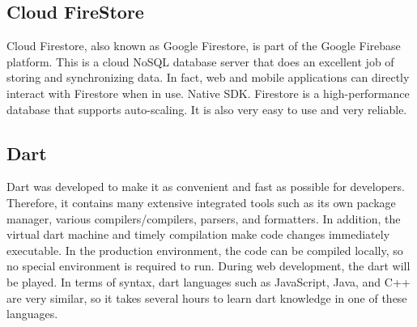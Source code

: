 \subsection{Cloud FireStore}
Cloud Firestore, also known as Google Firestore, is part of the Google Firebase platform. This is a cloud NoSQL database server that does an excellent job of storing and synchronizing data. In fact, web and mobile applications can directly interact with Firestore when in use. Native SDK. Firestore is a high-performance database that supports auto-scaling. It is also very easy to use and very reliable.

\subsection{Dart}
Dart was developed to make it as convenient and fast as possible for developers. Therefore, it contains many extensive integrated tools such as its own package manager, various compilers/compilers, parsers, and formatters. In addition, the virtual dart machine and timely compilation make code changes immediately executable. In the production environment, the code can be compiled locally, so no special environment is required to run. During web development, the dart will be played. In terms of syntax, dart languages such as JavaScript, Java, and C++ are very similar, so it takes several hours to learn dart knowledge in one of these languages.

